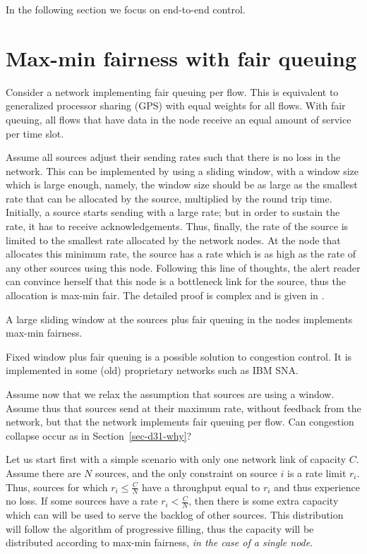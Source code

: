         In the following section we focus on end-to-end control.

\section{Max-min fairness with fair queuing}
Consider a network implementing fair queuing per flow. This is
equivalent to generalized processor sharing (GPS) with equal
weights for all flows. With fair queuing, all flows that have data
in the node receive an equal amount of service per time slot.

Assume all sources adjust their sending rates such that there is
no loss in the network. This can be implemented by using a sliding
window, with a window size which is large enough, namely, the
window size should be as large as the smallest rate that can be
allocated by the source, multiplied by the round trip time.
Initially, a source starts sending with a large rate; but in order
to sustain the rate, it has to receive acknowledgements. Thus,
finally, the rate of the source is limited to the smallest rate
allocated by the network nodes. At the node that allocates this
minimum rate, the source has a rate which is as high as the rate
of any other sources using this node. Following this line of
thoughts, the alert reader can convince herself that this node is
a bottleneck link for the source, thus the allocation is max-min
fair. The detailed proof is complex and is given in
\cite{Hahne91}.

\begin{proposition}
A large sliding window at the sources plus fair queuing in the
nodes implements max-min fairness.
\end{proposition}


Fixed window plus fair queuing is a possible solution to
congestion control. It is implemented in some (old) proprietary
networks such as IBM SNA.

Assume now that we relax the assumption that sources are using a
window. Assume thus that sources send at their maximum rate,
without feedback from the network, but that the network implements
fair queuing per flow. Can congestion collapse occur as in
Section~\ref{sec-d31-why}?

Let us start first with a simple scenario with only one network
link of capacity $C$. Assume there are $N$ sources, and the only
constraint on source $i$ is a rate limit $r_i$. Thus, sources for
which $r_i \leq \frac{C}{N}$ have a throughput equal to $r_i$ and
thus experience no loss. If some sources have a rate $r_i <
\frac{C}{N}$, then there is some extra capacity which can will be
used to serve the backlog of other sources. This distribution will
follow the algorithm of progressive filling, thus the capacity
will be distributed according to max-min fairness, \emph{in the
case of a single node}.

